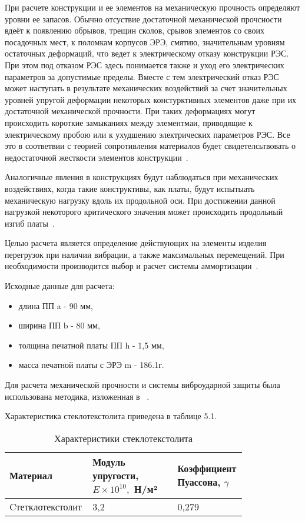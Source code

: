 При расчете конструкции и ее элементов на механическую прочность
определяют уровни ее запасов.  Обычно отсуствие достаточной
механической прочсности вдеёт к появлению обрывов, трещин сколов,
срывов элементов со своих посадочных мест, к поломкам корпусов ЭРЭ,
смятию, значительным уровням остаточных деформаций, что ведет к
электрическому отказу конструкции РЭС.
При этом под отказом РЭС здесь понимается также и уход его
электрических параметров за допустимые пределы. Вместе с тем
электрический отказ РЭС может наступать в результате механических
воздействий за счет значительных уровней упругой деформации некоторых
констурктивных элементов даже при их достаточной механической
прочности. При таких деформациях могут происходить короткие замыканиях
между элементмаи, приводящие к электрическому пробою или к ухудшению
электрических параметров РЭС. Все это в соответвии с теорией
сопротивления материалов будет свидетелсьтвовать о недостаточной
жесткости элементов конструкции~\cite{Kalenkovich1989}.

Аналогичные явления в конструкциях будут наблюдаться при механических
воздействиях, когда такие конструктивы, как платы, будут испытыать
механическую нагрузку вдоль их продольной оси.
При достижении данной нагрузкой некоторого критического значения может
происходить продольный изгиб платы~\cite{Kalenkovich1989}.

Целью расчета является определение действующих на элементы изделия
перегрузок при наличии вибрации, а также максимальных перемещений.
При необходимости производится выбор и расчет системы
аммортизации~\cite{Kalenkovich2012}.

Исходные данные для расчета:
\begin{itemize}
\item длина ПП a - 90 мм,
  
\item ширина ПП b - 80 мм,
  
\item толщина печатной платы ПП h - 1,5 мм,
  
\item масса печатной платы с ЭРЭ m - 186.1г.
\end{itemize}

Для расчета механической прочности и системы виброударной защиты была
использована методика, изложенная в ~\cite{Kostukevich2011}.

Характеристика стеклотекстолита приведена в таблице 5.1.

\begin{table}[H]
  \centering
  \begin{tabular}{|p{0.25\linewidth} | p{0.35\linewidth}| p{0.2\linewidth} |}
    \hline
    Материал & Модуль упругости, $E \times 10^{10},$ Н/м²& Коэффициент Пуассона, $\gamma$ \\
    \hline
    Cтетклотекстолит & 3,2 & 0,279 \\
    \hline
  \end{tabular}
  \caption{Характеристики стеклотекстолита}
\end{table}
